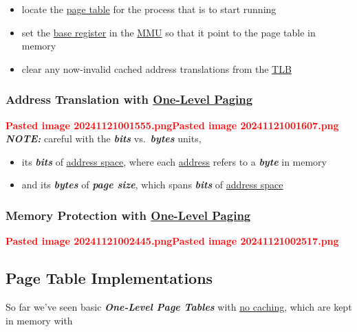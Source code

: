 \begin{itemize}
\tightlist
\item
  locate the \ul{page table} for the process that is to start running
\item
  set the \ul{base register} in the \ul{MMU} so that it point to the
  page table in memory
\item
  clear any now-invalid cached address translations from the \ul{TLB}
\end{itemize}

\subsubsection*{\texorpdfstring{Address Translation with \ul{One-Level
Paging}}{Address Translation with One-Level Paging}}

\textcolor{red}{\textbf{Pasted image 20241121001555.png}}\textcolor{red}{\textbf{Pasted image 20241121001607.png}}
\textbf{\textit{NOTE:}} careful with the \textbf{\textit{bits}}
vs.~\textbf{\textit{bytes}} units,

\begin{itemize}
\tightlist
\item
  its  \textbf{\textit{bits}} of \ul{address
  space}, where each \ul{address} refers to a \textbf{\textit{byte}} in
  memory
\item
  and its  \textbf{\textit{bytes}} of \textbf{\textit{page
  size}}, which spans  \textbf{\textit{bits}} of \ul{address
  space}
\end{itemize}

\subsubsection*{\texorpdfstring{Memory Protection with \ul{One-Level
Paging}}{Memory Protection with One-Level Paging}}

\textcolor{red}{\textbf{Pasted image 20241121002445.png}}\textcolor{red}{\textbf{Pasted image 20241121002517.png}}

\subsection*{Page Table Implementations}

So far we've seen basic \textbf{\textit{One-Level Page Tables}} with
\ul{no caching}, which are kept in memory with

